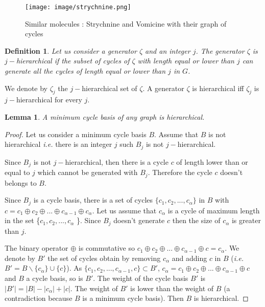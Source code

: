 \documentclass[journal=jacsat,manuscript=article]{achemso}
\newtheorem{definition}{Definition}
\newtheorem{lemme}{Lemma}
\begin{document}
\begin{figure}[H]
\texttt{[image: image/strychnine.png]}
\caption{Similar molecules : Strychnine and Vomicine  with their graph of cycles}
\label{strychnine}
\end{figure}

\begin{definition}
Let us consider a generator $\zeta$ and an integer $j$. The generator $\zeta$ is $j-$hierar\-chical if the subset of cycles of $\zeta$ with length equal or lower than $j$ can generate all the cycles of length equal or lower than $j$ in $G$. 
\end{definition}


We denote by $\zeta_j$ the $j-$hierarchical set of $\zeta$. A generator $\zeta$ is hierarchical iff $\zeta_j$ is $j-$hierarchical for every $j$. 

\begin{lemme}
A minimum cycle basis of any graph is hierarchical.
\end{lemme}

\begin{proof}
\normalfont
Let us consider a minimum cycle basis $B$. Assume that $B$ is not hierarchical \textit{i.e.} there is an integer $j$ such $B_j$ is not $j-$hierarchical. 

Since $B_j$ is not $j-$hierarchical, then there is a cycle $c$ of length lower than or equal to $j$ which cannot be generated with $B_j$. Therefore the cycle $c$ doesn't belongs to $B$. 

Since $B_j$ is a cycle basis, there is a set of cycles $\{c_1, c_2, ..., c_{\alpha}\}$ in $B$ with $ c = c_1 \oplus c_2 \oplus ... \oplus c_{\alpha -1 } \oplus c_{\alpha}$. Let us assume that $c_{\alpha}$ is a cycle of maximum length in the set \{$c_1, c_2, ..., c_{\alpha}$ \}. Since $B_j$ doesn't generate $c$ then the size of $c_{\alpha}$ is greater than $j$.

The binary operator $\oplus$ is commutative so $c_1 \oplus c_2 \oplus ... \oplus c_{\alpha -1 }\oplus c = c_{\alpha}$.
We denote by $B'$ the set of cycles obtain by removing $c_{\alpha}$ and adding $c$ in $B$ (\textit{i.e.} $B' = B \backslash \{c_{\alpha}\}\cup \{c\} $). As $\{c_1, c_2, ..., c_{\alpha-1},c\} \subset B'$, $ c_{\alpha} = c_1 \oplus c_2 \oplus ... \oplus c_{\alpha -1 } \oplus c $ and $B$ a cycle basis, so is $B'$. The weight of the cycle basis $B'$ is $|B'| = |B| -|c_{\alpha}|+ | c| $. The weight of $B'$ is lower than the weight of $B$ (a contradiction because $B$ is a minimum cycle basis). Then $B$ is hierarchical.

\end{proof}
\end{document}
